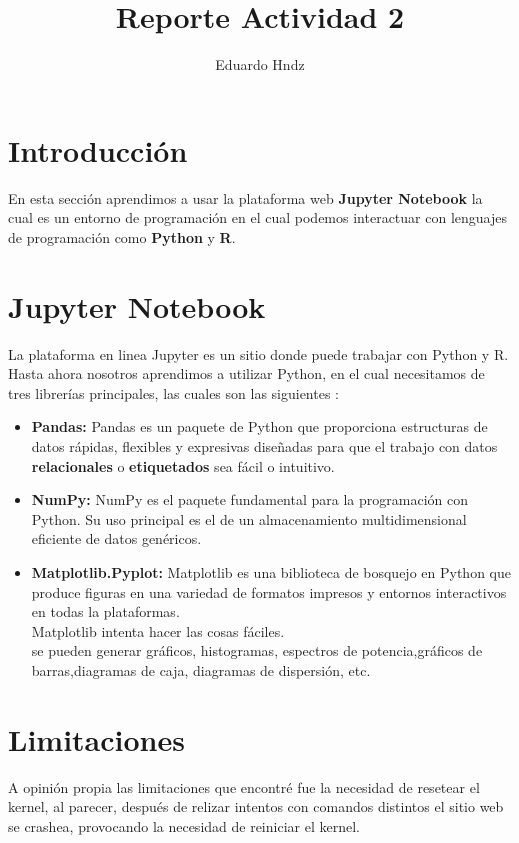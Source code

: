 \documentclass{article}
\title{Reporte Actividad 2}
\author{Eduardo Hndz}
\begin{document}
\maketitle
\section{Introducción}
En esta sección aprendimos a usar la plataforma web \textbf{Jupyter Notebook} la cual es un entorno de programación en el cual podemos interactuar con lenguajes de programación como \textbf{Python} y \textbf{R}.


\section{Jupyter Notebook}
La plataforma en linea Jupyter es un sitio donde puede trabajar con Python y R. \\
Hasta ahora nosotros aprendimos a utilizar Python, en el cual necesitamos de tres librerías principales, las cuales son las siguientes  $:$
\begin{itemize}
\item \textbf{Pandas:} Pandas es un paquete de Python que proporciona estructuras de datos rápidas, flexibles y expresivas  diseñadas para que el trabajo con  datos \textbf{relacionales} o \textbf{etiquetados} sea fácil o intuitivo.
\item \textbf{NumPy:} NumPy es el paquete fundamental para la programación con Python.
Su uso principal es el de un almacenamiento multidimensional eficiente de datos genéricos.
\item \textbf{Matplotlib.Pyplot:} Matplotlib es una biblioteca de bosquejo en Python que produce figuras en una variedad de formatos impresos y entornos interactivos en todas la plataformas.\\
Matplotlib intenta hacer las cosas fáciles.\\
se pueden generar gráficos, histogramas, espectros de potencia,gráficos de barras,diagramas de caja, diagramas de dispersión, etc.
\end{itemize}
\section{Limitaciones}
A opinión propia las limitaciones que encontré fue la necesidad de resetear el kernel, al parecer, después de relizar intentos con comandos distintos el sitio web se crashea, provocando la necesidad de reiniciar el kernel.
\end{document}
